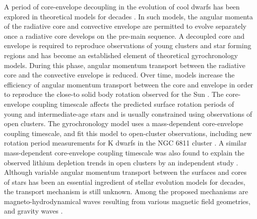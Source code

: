 \documentclass{aastex63}
\newcommand{\eg}{{\it e.g.}}
\newcommand{\mct}{\citet{mcquillan2014}}
\begin{document}
A period of core-envelope decoupling in the evolution of cool dwarfs has been
explored in theoretical models for decades \citep[\eg][]{endal1981,
macgregor1991, denissenkov2010, gallet2013}.
In such models, the angular momenta of the radiative core and convective
envelope are permitted to evolve separately once a radiative core develops on
the pre-main sequence.
A decoupled core and envelope is required to reproduce observations of young
clusters and star forming regions \citep[\eg][]{irwin2007, bouvier2008,
denissenkov2010, spada2011, reiners2012} and has become an established element
of theoretical gyrochronology models.
During this phase, angular momentum transport between the radiative core and
the convective envelope is reduced.
Over time, models increase the efficiency of angular momentum transport
between the core and envelope in order to reproduce the close-to solid body
rotation observed for the Sun \citep[\eg][]{thompson1996}.
The core-envelope coupling timescale affects the predicted surface rotation
periods of young and intermediate-age stars and is usually constrained using
observations of open clusters.
The \citet{lanzafame2015} gyrochronology model uses a mass-dependent
core-envelope coupling timescale, and \citet{spada2019} fit this model to
open-cluster observations, including new rotation period measurements for
K dwarfs in the NGC 6811 cluster \citep{curtis2019}.
A similar mass-dependent core-envelope coupling timescale was also found to
explain the observed lithium depletion trends in open clusters by an
independent study \citep{somers2016}.
Although variable angular momentum transport between the surfaces and cores of
stars has been an essential ingredient of stellar evolution models for
decades, the transport mechanism is still unknown.
Among the proposed mechanisms are magneto-hydrodynamical waves resulting from
various magnetic field geometries, and gravity waves \citep[see,
\eg][]{charbonneau1993, ruediger1996, spruit2002, talon2003, spada2010,
brun2011, oglethorpe2013}.

\end{document}
